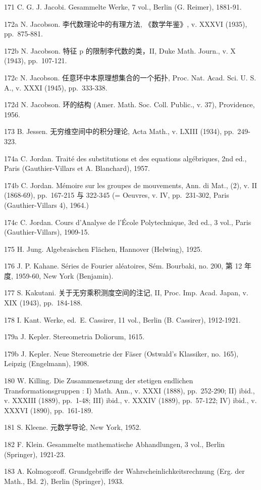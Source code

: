 171 C. G. J. Jacobi. Gesammelte Werke, 7 vol., Berlin (G. Reimer), 1881-91.

172a N. Jacobson. 李代数理论中的有理方法, 《数学年鉴》, v. XXXVI (1935), pp.~875-881.

172b N. Jacobson. 特征 p 的限制李代数的类，II, Duke Math. Journ., v. X (1943), pp.~107-121.

172c N. Jacobson. 任意环中本原理想集合的一个拓扑, Proc. Nat. Acad. Sci. U. S. A., v. XXXI (1945), pp.~333-338.

172d N. Jacobson. 环的结构 (Amer. Math. Soc. Coll. Public., v. 37), Providence, 1956.

173 B. Jessen. 无穷维空间中的积分理论, Acta Math., v. LXIII (1934), pp.~249-323.

174a C. Jordan. Traité des substitutions et des equations algébriques, 2nd ed., Paris (Gauthier-Villars et A. Blanchard), 1957.

174b C. Jordan. Mémoire sur les groupes de mouvements, Ann. di Mat., (2), v. II (1868-69), pp.~167-215 与 322-345 (= Oeuvres, v. IV, pp.~231-302, Paris (Gauthier-Villars 4), 1964.)

174c C. Jordan. Cours d'Analyse de l'École Polytechnique, 3rd ed., 3 vol., Paris (Gauthier-Villars), 1909-15.

175 H. Jung. Algebraischen Flächen, Hannover (Helwing), 1925.

176 J. P. Kahane. Séries de Fourier aléatoires, Sém. Bourbaki, no. 200, 第 12 年度, 1959-60, New York (Benjamin).

177 S. Kakutani. 关于无穷乘积测度空间的注记, II, Proc. Imp. Acad. Japan, v. XIX (1943), pp.~184-188.

178 I. Kant. Werke, ed.~E. Cassirer, 11 vol., Berlin (B. Cassirer), 1912-1921.

179a J. Kepler. Stereometria Doliorum, 1615.

179b J. Kepler. Neue Stereometrie der Fäser (Ostwald's Klassiker, no. 165), Leipzig (Engelmann), 1908.

180 W. Killing. Die Zusammensetzung der stetigen endlichen Transformationsgruppen : I) Math. Ann., v. XXXI (1888), pp.~252-290; II) ibid., v. XXXIII (1889), pp.~1-48; III) ibid., v. XXXIV (1889), pp.~57-122; IV) ibid., v. XXXVI (1890), pp.~161-189.

181 S. Kleene. 元数学导论, New York, 1952.

182 F. Klein. Gesammelte mathematische Abhandlungen, 3 vol., Berlin (Springer), 1921-23.

183 A. Kolmogoroff. Grundgebriffe der Wahrscheinlichkeitsrechnung (Erg. der Math., Bd. 2), Berlin (Springer), 1933.

